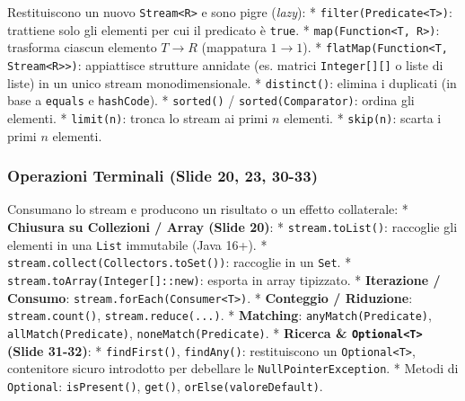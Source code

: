 \documentclass[11pt,a4paper,oneside]{report}
\newcommand{\passthrough}[1]{#1}
\begin{document}
Restituiscono un nuovo \passthrough{\lstinline!Stream<R>!} e sono pigre
(\emph{lazy}): * \passthrough{\lstinline!filter(Predicate<T>)!}:
trattiene solo gli elementi per cui il predicato è
\passthrough{\lstinline!true!}. *
\passthrough{\lstinline!map(Function<T, R>)!}: trasforma ciascun
elemento \(T \to R\) (mappatura \(1 \to 1\)). *
\passthrough{\lstinline!flatMap(Function<T, Stream<R>>)!}: appiattisce
strutture annidate (es. matrici \passthrough{\lstinline!Integer[][]!} o
liste di liste) in un unico stream monodimensionale. *
\passthrough{\lstinline!distinct()!}: elimina i duplicati (in base a
\passthrough{\lstinline!equals!} e \passthrough{\lstinline!hashCode!}).
* \passthrough{\lstinline!sorted()!} /
\passthrough{\lstinline!sorted(Comparator)!}: ordina gli elementi. *
\passthrough{\lstinline!limit(n)!}: tronca lo stream ai primi \(n\)
elementi. * \passthrough{\lstinline!skip(n)!}: scarta i primi \(n\)
elementi.

\subsubsection{Operazioni Terminali (Slide 20, 23,
30-33)}\label{chap17_operazioni-terminali-slide-20-23-30-33}

Consumano lo stream e producono un risultato o un effetto collaterale: *
\textbf{Chiusura su Collezioni / Array (Slide 20)}: *
\passthrough{\lstinline!stream.toList()!}: raccoglie gli elementi in una
\passthrough{\lstinline!List!} immutabile (Java 16+). *
\passthrough{\lstinline!stream.collect(Collectors.toSet())!}: raccoglie
in un \passthrough{\lstinline!Set!}. *
\passthrough{\lstinline!stream.toArray(Integer[]::new)!}: esporta in
array tipizzato. * \textbf{Iterazione / Consumo}:
\passthrough{\lstinline!stream.forEach(Consumer<T>)!}. *
\textbf{Conteggio / Riduzione}:
\passthrough{\lstinline!stream.count()!},
\passthrough{\lstinline!stream.reduce(...)!}. * \textbf{Matching}:
\passthrough{\lstinline!anyMatch(Predicate)!},
\passthrough{\lstinline!allMatch(Predicate)!},
\passthrough{\lstinline!noneMatch(Predicate)!}. * \textbf{Ricerca \&
\passthrough{\lstinline!Optional<T>!} (Slide 31-32)}: *
\passthrough{\lstinline!findFirst()!},
\passthrough{\lstinline!findAny()!}: restituiscono un
\passthrough{\lstinline!Optional<T>!}, contenitore sicuro introdotto per
debellare le \passthrough{\lstinline!NullPointerException!}. * Metodi di
\passthrough{\lstinline!Optional!}:
\passthrough{\lstinline!isPresent()!}, \passthrough{\lstinline!get()!},
\passthrough{\lstinline!orElse(valoreDefault)!}.
\end{document}
